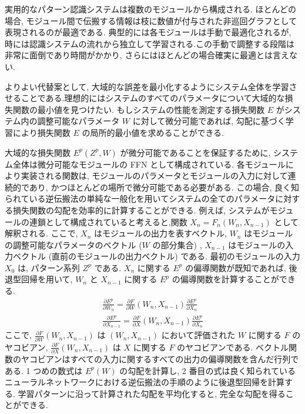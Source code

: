 \documentclass[twocolumn]{jarticle}     %
\begin{document}
 実用的なパターン認識システムは複数のモジュールから構成される.
ほとんどの場合, モジュール間で伝搬する情報は枝に数値が付与された非巡回グラフとして表現されるのが最適である. 典型的には各モジュールは手動で最適化されるが, 時には認識システムの流れから独立して学習される.この手動で調整する段階は非常に面倒であり時間がかかり, さらにはほとんどの場合確実に最適とは言えない.
\par
よりよい代替案として, 大域的な誤差を最小化するようにシステム全体を学習させることである.理想的にはシステムのすべてのパラメータについて大域的な損失関数の最小値を見つけたい. もしシステムの性能を測定する損失関数 $E$ がシステム内の調整可能なパラメータ $W$ に対して微分可能であれば, 勾配に基づく学習により損失関数 $E$ の局所的最小値を求めることができる.
\par
大域的な損失関数 $E^p (Z^p , W)$ が微分可能であることを保証するために, システム全体は微分可能なモジュールの FFN として構成されている. 各モジュールにより実装される関数は, モジュールのパラメータとモジュールの入力に対して連続的であり, かつほとんどの場所で微分可能である必要がある.
この場合, 良く知られている逆伝搬法の単純な一般化を用いてシステムの全てのパラメータに対する損失関数の勾配を効率的に計算することができる.
例えば,  システムがモジュールの連鎖として構成されていると考えると,関数 $X_n = F_n (W_n , X_{n-1})$ として解釈される.
ここで, $X_n$ はモジュールの出力を表すベクトル, $W_n$ はモジュールの調整可能なパラメータのベクトル ($W$ の部分集合) , $X_{n-1}$ はモジュールの入力ベクトル (直前のモジュールの出力ベクトル) である.
最初のモジュールの入力 $X_0$ は, パターン系列 $Z^p$ である. $X_n$ に関する $E^p$ の偏導関数が既知であれば, 後退型回帰を用いて, $W_n$ と $X_{n-1}$ に関する $E^p$ の偏導関数を計算することができる.
\begin{eqnarray}
  \frac{\partial E^p}{\partial W_n} = \frac{\partial F}{\partial W} (W_n , X_{n-1}) \frac{\partial E^p}{\partial X_n}  \nonumber \\ 
  \frac{\partial E^p}{\partial X_{n-1}} = \frac{\partial F}{\partial X} (W_n , X_{n-1}) \frac{\partial E^p}{\partial X_n} 
\end{eqnarray}
ここで, $\frac{\partial F}{\partial W} (W_n , X_{n-1})$ は $(W_n , X_{n-1})$ において評価された $W$ に関する $F$ のヤコビアン, $\frac{\partial F}{\partial X} (W_n , X_{n-1})$ は $X$ に関する $F$ のヤコビアンである. ベクトル関数のヤコビアンはすべての入力に関するすべての出力の偏導関数を含んだ行列である. 1 つめの数式は $E^p (W)$ の勾配を計算し, 2 番目の式は良く知られているニューラルネットワークにおける逆伝搬法の手順のように後退型回帰を計算する. 学習パターンに沿って計算された勾配を平均化すると, 完全な勾配を得ることができる.
\end{document}
